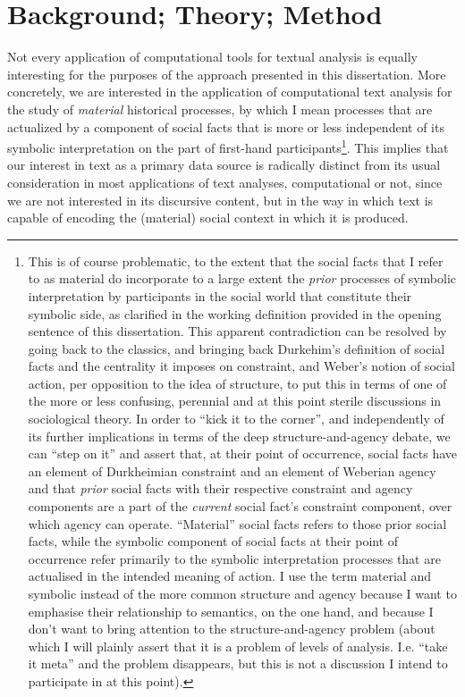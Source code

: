 \chapter{Background; Theory; Method}
\label{chap:frame}

Not every application of computational tools for textual analysis is equally interesting for the purposes of the approach presented in this dissertation.
More concretely, we are interested in the application of computational text analysis for the study of \emph{material} historical processes, by which I mean processes that are actualized by a component of social facts that is more or less independent of its symbolic interpretation on the part of first-hand participants\footnote{
    This is of course problematic, to the extent that the social facts that I refer to as material do incorporate to a large extent the \emph{prior} processes of symbolic interpretation by participants in the social world that constitute their symbolic side, as clarified in the working definition provided in the opening sentence of this dissertation.
    This apparent contradiction can be resolved by going back to the classics, and bringing back Durkehim's definition of social facts and the centrality it imposes on constraint, and Weber's notion of social action, per opposition to the idea of structure, to put this in terms of one of the more or less confusing, perennial and at this point sterile discussions in sociological theory.
    In order to ``kick it to the corner'', and independently of its further implications in terms of the deep structure-and-agency debate, we can ``step on it'' and assert that, at their point of occurrence, social facts have an element of Durkheimian constraint and an element of Weberian agency and that \emph{prior} social facts with their respective constraint and agency components are a part of the \emph{current} social fact's constraint component, over which agency can operate.
    ``Material'' social facts refers to those prior social facts, while the symbolic component of social facts at their point of occurrence refer primarily to the symbolic interpretation processes that are actualised in the intended meaning of action.
    I use the term material and symbolic instead of the more common structure and agency because I want to emphasise their relationship to semantics, on the one hand, and because I don't want to bring attention to the structure-and-agency problem (about which I will plainly assert that it is a problem of levels of analysis. I.e. ``take it meta'' and the problem disappears, but this is not a discussion I intend to participate in at this point).
}.
This implies that our interest in text as a primary data source is radically distinct from its usual consideration in most applications of text analyses, computational or not, since we are not interested in its discursive content, but in the way in which text is capable of encoding the (material) social context in which it is produced.

